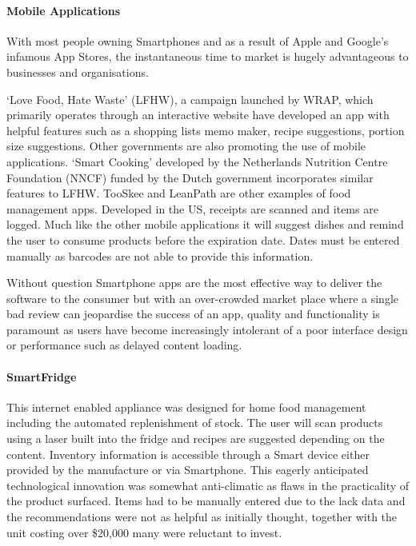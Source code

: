 \documentclass[a4paper, 11pt]{article}
\begin{document}
\paragraph{Mobile Applications}
With most people owning Smartphones and as a result of Apple and Google's infamous App Stores, the instantaneous time to market is hugely advantageous to businesses and organisations. 

`Love Food, Hate Waste' (LFHW), a campaign launched by WRAP, which primarily operates through an interactive website have developed an app with helpful features such as a shopping lists memo maker, recipe suggestions, portion size suggestions. Other governments are also promoting the use of mobile applications. `Smart Cooking' developed by the Netherlands Nutrition Centre Foundation (NNCF) funded by the Dutch government incorporates similar features to LFHW. TooSkee and LeanPath are other examples of food management apps. Developed in the US, receipts are scanned and items are logged. Much like the other mobile applications it will suggest dishes and remind the user to consume products before the expiration date. Dates must be entered manually as barcodes are not able to provide this information. 

Without question Smartphone apps are the most effective way to deliver the software to the consumer but with an over-crowded market place where a single bad review can jeopardise the success of an app, quality and functionality is paramount as users have become increasingly intolerant of a poor interface design or performance such as delayed content loading.

\paragraph{SmartFridge}
This internet enabled appliance was designed for home food management including the automated replenishment of stock. The user will scan products using a laser built into the fridge and recipes are suggested depending on the content. Inventory information is accessible through a Smart device either provided by the manufacture or via Smartphone. This eagerly anticipated technological innovation was somewhat anti-climatic as flaws in the practicality of the product surfaced. Items had to be manually entered due to the lack data and the recommendations were not as helpful as initially thought, together with the unit costing over \$20,000 many were reluctant to invest.
\end{document}
